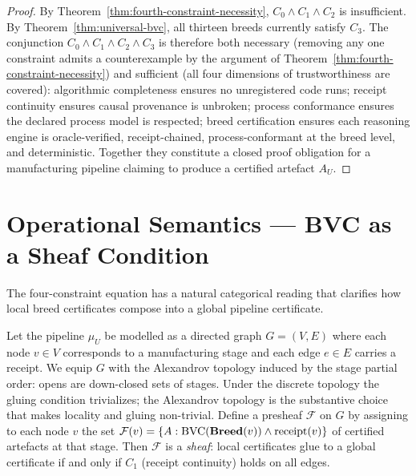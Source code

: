 \begin{proof}
By Theorem~\ref{thm:fourth-constraint-necessity}, $C_0 \wedge C_1 \wedge C_2$ is
insufficient. By Theorem~\ref{thm:universal-bvc}, all thirteen breeds currently satisfy
$C_3$. The conjunction $C_0 \wedge C_1 \wedge C_2 \wedge C_3$ is therefore both
necessary (removing any one constraint admits a counterexample by the argument of
Theorem~\ref{thm:fourth-constraint-necessity}) and sufficient (all four dimensions of
trustworthiness are covered): algorithmic completeness ensures no unregistered code runs;
receipt continuity ensures causal provenance is unbroken; process conformance ensures
the declared process model is respected; breed certification ensures each reasoning
engine is oracle-verified, receipt-chained, process-conformant at the breed level, and
deterministic. Together they constitute a closed proof obligation for a manufacturing
pipeline claiming to produce a certified artefact $A_U$.
\end{proof}

\section{Operational Semantics --- BVC as a Sheaf Condition}
\label{sec:sheaf-condition}

The four-constraint equation has a natural categorical reading that clarifies how local
breed certificates compose into a global pipeline certificate.

\begin{proposition}
\label{prop:sheaf-condition}
Let the pipeline $\mu_U$ be modelled as a directed graph $G = (V, E)$ where each
node $v \in V$ corresponds to a manufacturing stage and each edge $e \in E$ carries a
receipt. We equip $G$ with the Alexandrov topology induced by the stage partial order: opens are down-closed sets of stages. Under the discrete topology the gluing condition trivializes; the Alexandrov topology is the substantive choice that makes locality and gluing non-trivial. Define a presheaf $\mathcal{F}$ on $G$ by assigning to each node $v$ the set
$\mathcal{F}(v) = \{A : \mathrm{BVC}(\mathbf{Breed}(v)) \wedge \text{receipt}(v)\}$ of
certified artefacts at that stage. Then $\mathcal{F}$ is a \emph{sheaf}: local
certificates glue to a global certificate if and only if $C_1$ (receipt continuity)
holds on all edges.
\end{proposition}

